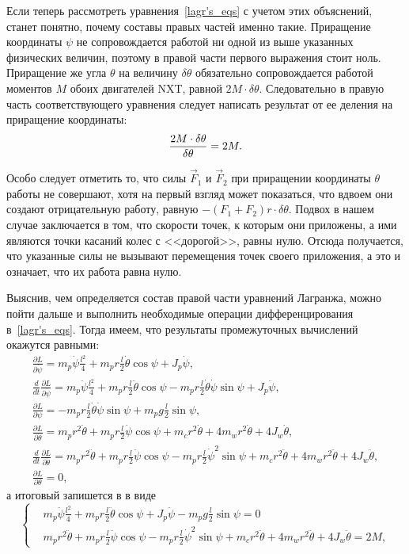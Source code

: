 \documentclass[12pt,a4paper,openany]{extarticle}
\begin{document}
Если теперь рассмотреть уравнения~\eqref{lagr's_eqs} с учетом этих объяснений, станет понятно, почему составы правых частей именно такие.
Приращение координаты $\psi$ не сопровождается работой ни одной из выше указанных физических величин, поэтому в правой части первого выражения стоит ноль.
Приращение же угла $\theta$ на величину $\delta\theta$ обязательно сопровождается работой моментов $M$ обоих двигателей NXT, равной $2M\cdot\delta\theta$.
Следовательно в правую часть соответствующего уравнения следует написать результат от ее деления на приращение координаты: 
\begin{equation}
	\frac{2M\cdot\delta\theta}{\delta\theta} = 2M\ldotp
\end{equation} 

Особо следует отметить то, что силы $\vec F_1$ и $\vec F_2$ при приращении координаты $\theta$ работы не совершают, хотя на первый взгляд может показаться, что вдвоем они создают отрицательную работу, равную $-(F_1+F_2)r\cdot\delta\theta$.
Подвох в нашем случае заключается в том, что скорости точек, к которым они приложены, а ими являются точки касаний колес с <<дорогой>>, равны нулю.  
Отсюда получается, что указанные силы не вызывают перемещения точек своего приложения, а это и означает, что их работа равна нулю.

Выяснив, чем определяется состав правой части уравнений Лагранжа, можно пойти дальше и выполнить необходимые операции дифференцирования в~\eqref{lagr's_eqs}.
Тогда имеем, что результаты промежуточных вычислений окажутся равными:
\begin{gather}
	\frac{\partial L}{\partial\dot{\psi}} = m_p\dot\psi\frac{l^2}4 + m_pr\frac l2\dot\theta\cos\psi + J_p\dot\psi,\\
	\frac{d}{dt}\frac{\partial L}{\partial\dot{\psi}} = m_p\ddot\psi\frac{l^2}4 + m_pr\frac l2\ddot\theta\cos\psi - 
		m_pr\frac l2\dot\theta\dot\psi\sin\psi + J_p\ddot\psi,\\
	\frac{\partial L}{\partial\psi} = - m_pr\frac l2\dot\theta\dot\psi\sin\psi + m_pg\frac l2\sin\psi,\\
	\frac{\partial L}{\partial\dot{\theta}} = m_pr^2\dot\theta + m_pr\frac l2\dot\psi\cos\psi + m_cr^2\dot\theta + 4m_wr^2\dot\theta + 
		4J_w\dot\theta,\\
	\frac{d}{dt}\frac{\partial L}{\partial\dot{\theta}} = m_pr^2\ddot\theta + m_pr\frac l2\ddot\psi\cos\psi - m_pr\frac l2\dot\psi^2\sin\psi 
		+ m_cr^2\ddot\theta + 4m_wr^2\ddot\theta +	4J_w\ddot\theta,\\
	\frac{\partial L}{\partial\theta} = 0,
\end{gather}
а итоговый запишется в в виде
\begin{equation}\label{final_lagr's}
	\left\{  
	\begin{aligned}
		\!&m_p\ddot\psi\frac{l^2}4 + m_pr\frac l2\ddot\theta\cos\psi + J_p\ddot\psi - m_pg\frac l2\sin\psi= 0\\
		\!&m_pr^2\ddot\theta + m_pr\frac l2\ddot\psi\cos\psi - m_pr\frac l2\dot\psi^2\sin\psi + m_cr^2\ddot\theta + 4m_wr^2\ddot\theta +
		4J_w\ddot\theta = 2M,
	\end{aligned}   
	\right.
\end{equation}
\end{document}
